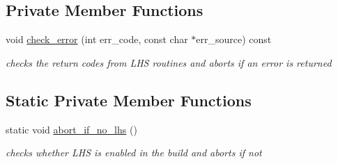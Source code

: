\subsection*{Private Member Functions}
\begin{DoxyCompactItemize}
\item 
void \hyperlink{classPecos_1_1LHSDriver_a9bdfdc41dd463d47a3a040c37e9ebbe2}{check\+\_\+error} (int err\+\_\+code, const char $\ast$err\+\_\+source) const \label{classPecos_1_1LHSDriver_a9bdfdc41dd463d47a3a040c37e9ebbe2}

\begin{DoxyCompactList}\small\item\em checks the return codes from L\+HS routines and aborts if an error is returned \end{DoxyCompactList}\end{DoxyCompactItemize}
\subsection*{Static Private Member Functions}
\begin{DoxyCompactItemize}
\item 
static void \hyperlink{classPecos_1_1LHSDriver_afa529bd148f75631d3ba0086b65f51e5}{abort\+\_\+if\+\_\+no\+\_\+lhs} ()\label{classPecos_1_1LHSDriver_afa529bd148f75631d3ba0086b65f51e5}

\begin{DoxyCompactList}\small\item\em checks whether L\+HS is enabled in the build and aborts if not \end{DoxyCompactList}\end{DoxyCompactItemize}
